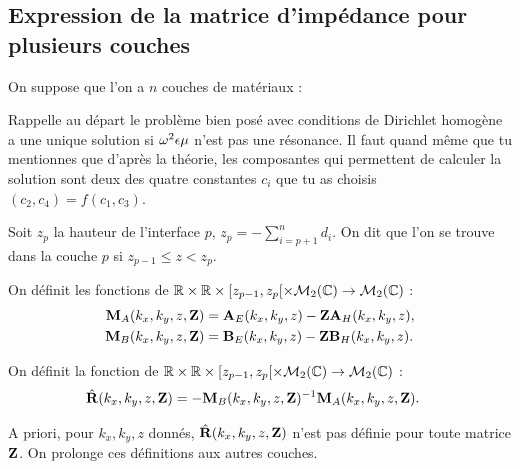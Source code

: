   \subsection{Expression de la matrice d'impédance pour plusieurs couches}
    On suppose que l'on a \(n\) couches de matériaux :
    \begin{figure}[h!btp]
        \centering
        \begin{tikzpicture}
            
        \end{tikzpicture}
    \end{figure}
    \begin{REM}
      Rappelle au départ le problème bien posé avec conditions de Dirichlet homogène a une unique solution si \(\w^2\eps\mu\) n'est pas une résonance.
      Il faut quand même que tu mentionnes que d'après la théorie, les composantes qui permettent de calculer la solution sont deux des quatre constantes \(c_i\) que tu as choisis \((c_2,c_4)=f(c_1,c_3)\).
    \end{REM}
    Soit \(z_p\) la hauteur de l'interface \(p\), \(z_p = -\sum_{i=p+1}^{n} d_{i}\). On dit que l'on se trouve dans la couche \(p\) si \(z_{p-1} \le z < z_p \).

    \begin{defn}
      \label{def:plan:matrices_MA-MB}
      On définit les fonctions de \(\RR\times\RR\times [z_{p-1}, z_p[ \times \mathcal{M}_{2}(\CC) \rightarrow \mathcal{M}_{2}(\CC)\) :
      \begin{align*}
        \mM_{A}(k_x,k_y,z,\mZ) &= \mA_{E}(k_x,k_y,z)-\mZ\mA_{H}(k_x,k_y,z),
        \\
        \mM_{B}(k_x,k_y,z,\mZ) &= \mB_{E}(k_x,k_y,z)-\mZ\mB_{H}(k_x,k_y,z).
      \end{align*}
    \end{defn}

    \begin{defn}
      \label{def:plan:reflexion:impedance}
      On définit la fonction de \(\RR\times\RR\times [z_{p-1}, z_p[ \times \mathcal{M}_{2}(\CC) \rightarrow \mathcal{M}_{2}(\CC)\) :
      \begin{align*}
        \hat\mR(k_x,k_y,z,\mZ) &= -\mM_{B}(k_x,k_y,z,\mZ)^{-1}\mM_{A}(k_x,k_y,z,\mZ).
      \end{align*}
    \end{defn}
    A priori, pour \(k_x,k_y,z\) donnés, \(\hat\mR(k_x,k_y,z,\mZ)\) n'est pas définie pour toute matrice \(\mZ\).
    On prolonge ces définitions aux autres couches.

